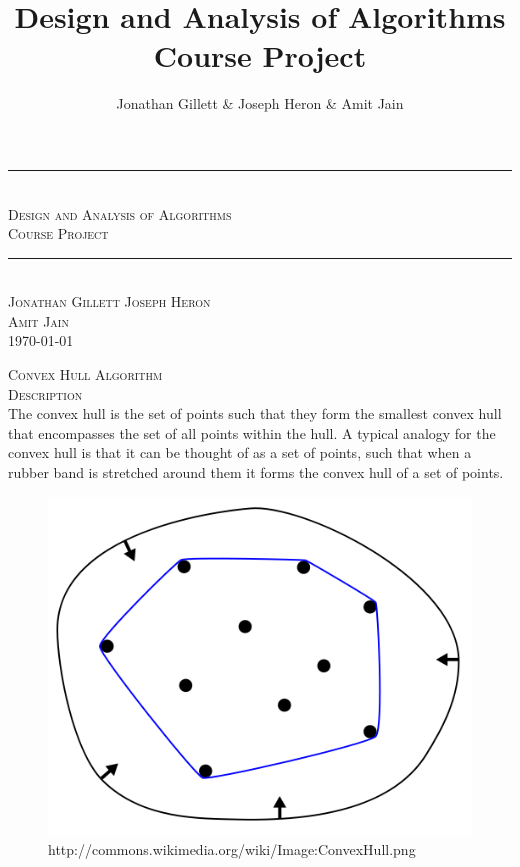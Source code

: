 \documentclass[pdftex,12pt,a4paper]{article}
\title{Design and Analysis of Algorithms Course Project}
\author{Jonathan Gillett \& Joseph Heron \& Amit Jain}
\newcommand{\HRule}{\rule{\linewidth}{0.5mm}}
\newcommand{\nspace}{\\[0.25cm]}
\newcommand{\Lspace}{\\[1.0cm]}
\begin{document}
\pagestyle{empty}
\begin{titlepage}
  		\newlength{\saveparindent}
		\setlength{\saveparindent}{\parindent}
		\setlength{\parindent}{0cm}
  		\sf
		\center
 
  		\HRule\\[0.60cm]
			\textsc{\Huge Design and Analysis of Algorithms}\\[0.25cm] 
			\textsc{\Huge Course Project}\\[0.50cm]
		\HRule\\[6.5cm]
		\textsc{\LARGE Jonathan Gillett \qquad Joseph Heron}\\[0.65cm]
		\textsc{\LARGE Amit Jain}\\[6.5cm]
		\textsc{\LARGE{}\today}\\

  		\setlength{\parindent}{\saveparindent}
\end{titlepage}


\flushleft


\textsc{\Huge Convex Hull Algorithm} \hfill \Lspace


\textsc{\Large Description} \hfill \nspace

The convex hull is the set of points such that they form the smallest convex hull that encompasses the set of all points within the hull. A typical analogy for the convex hull is that it can be thought of as a set of points, such that when a rubber band is stretched around them it forms the
convex hull of a set of points.

\begin{figure}[h!]
  \centering
	\includegraphics[scale=0.4]{img/convexhull_rubberband.png}
	\caption{http://commons.wikimedia.org/wiki/Image:ConvexHull.png}
\end{figure}
\end{document}
